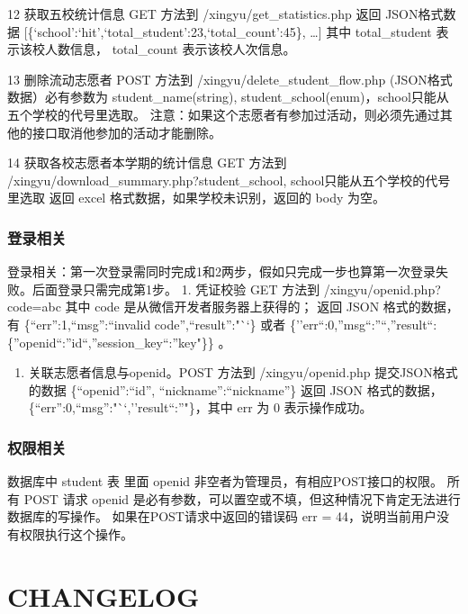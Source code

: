 \documentclass[]{ctexart}
\begin{document}
12 获取五校统计信息 GET 方法到 /xingyu/get\_statistics.php 返回
JSON格式数据
{[}\{`school':`hit',`total\_student':23,`total\_count':45\}, \ldots{}{]}
其中 total\_student 表示该校人数信息， total\_count 表示该校人次信息。

13 删除流动志愿者 POST 方法到 /xingyu/delete\_student\_flow.php
(JSON格式数据）必有参数为 student\_name(string),
student\_school(enum)，school只能从五个学校的代号里选取。
注意：如果这个志愿者有参加过活动，则必须先通过其他的接口取消他参加的活动才能删除。

14 获取各校志愿者本学期的统计信息 GET 方法到
/xingyu/download\_summary.php?student\_school,
school只能从五个学校的代号里选取 返回 excel
格式数据，如果学校未识别，返回的 body 为空。

\hypertarget{ux767bux5f55ux76f8ux5173}{%
\subsubsection{登录相关}\label{ux767bux5f55ux76f8ux5173}}

登录相关：第一次登录需同时完成1和2两步，假如只完成一步也算第一次登录失败。后面登录只需完成第1步。
1. 凭证校验 GET 方法到 /xingyu/openid.php?code=abc 其中 code
是从微信开发者服务器上获得的； 返回 JSON 格式的数据，有
\{``err'':1,``msg'':``invalid code'',``result'':"``\} 或者
\{''err``:0,''msg``:''``,''result``:\{''openid``:''id``,''session\_key``:''key"\}\}
。

\begin{enumerate}
\def\labelenumi{\arabic{enumi}.}
\setcounter{enumi}{1}
\item
  关联志愿者信息与openid。POST 方法到 /xingyu/openid.php
  提交JSON格式的数据 \{``openid'':``id'', ``nickname'':``nickname''\}
  返回 JSON 格式的数据，\{``err'':0,``msg'':"``,''result``:''"\}，其中
  err 为 0 表示操作成功。
\end{enumerate}

\hypertarget{ux6743ux9650ux76f8ux5173}{%
\subsubsection{权限相关}\label{ux6743ux9650ux76f8ux5173}}

数据库中 student 表 里面 openid 非空者为管理员，有相应POST接口的权限。
所有 POST 请求 openid
是必有参数，可以置空或不填，但这种情况下肯定无法进行数据库的写操作。
如果在POST请求中返回的错误码 err =
44，说明当前用户没有权限执行这个操作。

\hypertarget{changelog}{%
\section{CHANGELOG}\label{changelog}}
\end{document}
